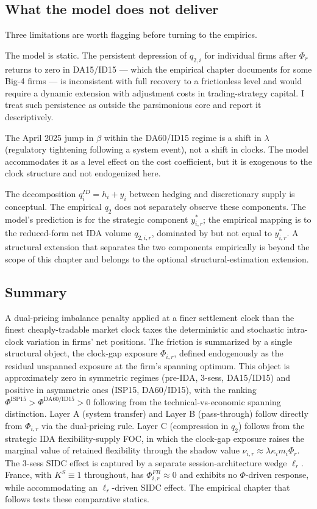 \documentclass[11pt]{article}
\begin{document}
\subsection{What the model does not deliver}
\label{sec:model-limits}

Three limitations are worth flagging before turning to the empirics.

The model is static. The persistent depression of $q_{2,i}$ for individual firms after $\Phi_{r}$ returns to zero in DA15/ID15 --- which the empirical chapter documents for some Big-4 firms --- is inconsistent with full recovery to a frictionless level and would require a dynamic extension with adjustment costs in trading-strategy capital. I treat such persistence as outside the parsimonious core and report it descriptively.

The April 2025 jump in $\beta$ within the DA60/ID15 regime is a shift in $\lambda$ (regulatory tightening following a system event), not a shift in clocks. The model accommodates it as a level effect on the cost coefficient, but it is exogenous to the clock structure and not endogenized here.

The decomposition $q^{ID}_{i} = h_{i} + y_{i}$ between hedging and discretionary supply is conceptual. The empirical $q_{2}$ does not separately observe these components. The model's prediction is for the strategic component $y^{*}_{i,r}$; the empirical mapping is to the reduced-form net IDA volume $q_{2,i,r}$, dominated by but not equal to $y^{*}_{i,r}$. A structural extension that separates the two components empirically is beyond the scope of this chapter and belongs to the optional structural-estimation extension.

\subsection*{Summary}

A dual-pricing imbalance penalty applied at a finer settlement clock than the finest cheaply-tradable market clock taxes the deterministic and stochastic intra-clock variation in firms' net positions. The friction is summarized by a single structural object, the clock-gap exposure $\Phi_{i,r}$, defined endogenously as the residual unspanned exposure at the firm's spanning optimum. This object is approximately zero in symmetric regimes (pre-IDA, 3-sess, DA15/ID15) and positive in asymmetric ones (ISP15, DA60/ID15), with the ranking $\Phi^{\text{ISP15}} > \Phi^{\text{DA60/ID15}} > 0$ following from the technical-vs-economic spanning distinction. Layer A (system transfer) and Layer B (pass-through) follow directly from $\Phi_{i,r}$ via the dual-pricing rule. Layer C (compression in $q_{2}$) follows from the strategic IDA flexibility-supply FOC, in which the clock-gap exposure raises the marginal value of retained flexibility through the shadow value $\nu_{i,r} \approx \lambda \kappa_{i} m_{i} \Phi_{r}$. The 3-sess SIDC effect is captured by a separate session-architecture wedge $\ell_{r}$. France, with $K^{S} \equiv 1$ throughout, has $\Phi^{FR}_{i,r} \approx 0$ and exhibits no $\Phi$-driven response, while accommodating an $\ell_{r}$-driven SIDC effect. The empirical chapter that follows tests these comparative statics.
\end{document}
